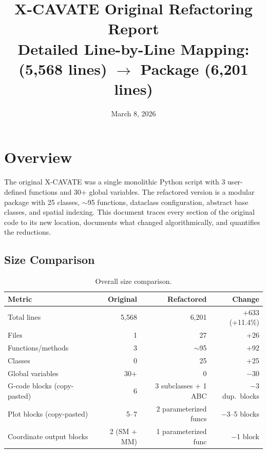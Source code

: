 \documentclass[11pt,letterpaper]{article}
\title{
    \vspace{-1cm}
    \textbf{X-CAVATE Original Refactoring Report}\\[6pt]
    \large Detailed Line-by-Line Mapping:\\
    \code{xcavate\_11\_30\_25.py} (5,568 lines) $\to$ \code{xcavate/} Package (6,201 lines)
}
\author{}
\date{March 8, 2026}
\begin{document}
\maketitle
\thispagestyle{fancy}

\tableofcontents
\newpage

\section{Overview}

The original X-CAVATE was a single monolithic Python script with 3 user-defined functions and 30+ global variables. The refactored version is a modular package with 25 classes, $\sim$95 functions, dataclass configuration, abstract base classes, and spatial indexing. This document traces every section of the original code to its new location, documents what changed algorithmically, and quantifies the reductions.

\subsection{Size Comparison}

\begin{table}[h]
\centering
\begin{tabular}{l r r r}
\toprule
\textbf{Metric} & \textbf{Original} & \textbf{Refactored} & \textbf{Change} \\
\midrule
Total lines               & 5,568  & 6,201  & +633 (+11.4\%) \\
Files                     & 1      & 27     & +26 \\
Functions/methods         & 3      & $\sim$95 & +92 \\
Classes                   & 0      & 25     & +25 \\
Global variables          & 30+    & 0      & $-$30 \\
G-code blocks (copy-pasted) & 6    & 3 subclasses + 1 ABC & $-$3 dup.\ blocks \\
Plot blocks (copy-pasted) & 5--7   & 2 parameterized funcs & $-$3--5 blocks \\
Coordinate output blocks  & 2 (SM + MM) & 1 parameterized func & $-$1 block \\
\bottomrule
\end{tabular}
\caption{Overall size comparison.}
\end{table}
\end{document}

